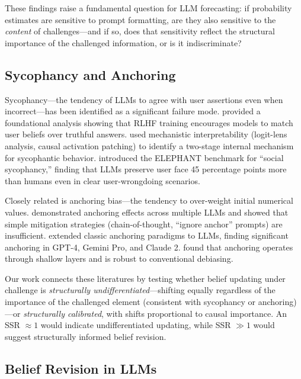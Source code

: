 \documentclass[11pt]{article}
\begin{document}
These findings raise a fundamental question for LLM forecasting: if probability estimates are sensitive to prompt formatting, are they also sensitive to the \textit{content} of challenges---and if so, does that sensitivity reflect the structural importance of the challenged information, or is it indiscriminate?

\subsection{Sycophancy and Anchoring}

Sycophancy---the tendency of LLMs to agree with user assertions even when incorrect---has been identified as a significant failure mode. \citet{sharma2024towards} provided a foundational analysis showing that RLHF training encourages models to match user beliefs over truthful answers. \citet{wang2025sycophancy} used mechanistic interpretability (logit-lens analysis, causal activation patching) to identify a two-stage internal mechanism for sycophantic behavior. \citet{cheng2025elephant} introduced the ELEPHANT benchmark for ``social sycophancy,'' finding that LLMs preserve user face 45 percentage points more than humans even in clear user-wrongdoing scenarios.

Closely related is anchoring bias---the tendency to over-weight initial numerical values. \citet{li2025anchoring} demonstrated anchoring effects across multiple LLMs and showed that simple mitigation strategies (chain-of-thought, ``ignore anchor'' prompts) are insufficient. \citet{echterhoff2024anchoring} extended classic anchoring paradigms to LLMs, finding significant anchoring in GPT-4, Gemini Pro, and Claude 2. \citet{huang2025anchoring} found that anchoring operates through shallow layers and is robust to conventional debiasing.

Our work connects these literatures by testing whether belief updating under challenge is \textit{structurally undifferentiated}---shifting equally regardless of the importance of the challenged element (consistent with sycophancy or anchoring)---or \textit{structurally calibrated}, with shifts proportional to causal importance. An SSR $\approx 1$ would indicate undifferentiated updating, while SSR $\gg 1$ would suggest structurally informed belief revision.

\subsection{Belief Revision in LLMs}
\end{document}
